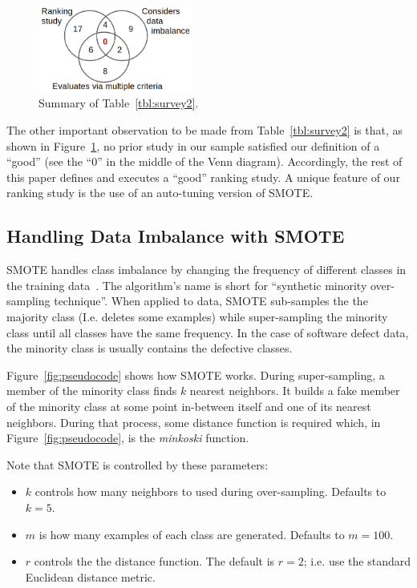 \documentclass[10pt,conference]{IEEEtran}
\newcommand{\bi}{\begin{itemize}[leftmargin=0.4cm]}
\newcommand{\ei}{\end{itemize}}
\theoremstyle{break}
\theoremstyle{break}
\begin{document}
\begin{figure}[!t]
\begin{center}
\includegraphics[width=2in]{venn.png}
\end{center}
\caption{Summary of Table~\ref{tbl:survey2}.}\label{fig:s2}
\end{figure}
The other important observation to be made from  Table~\ref{tbl:survey2} is that, as shown in Figure~\ref{fig:s2}, no prior study in our sample satisfied  our definition of a ``good'' (see the ``0'' in the middle of the Venn diagram).
Accordingly, the rest of this
paper defines and executes a ``good'' ranking  study. A unique feature of our
ranking study is the use of an auto-tuning version of SMOTE.
 
 
 
\subsection{Handling Data Imbalance with SMOTE}

SMOTE handles class imbalance by changing the frequency of different classes in the training
data~\cite{chawla2002smote}. 
The algorithm's name is short for ``synthetic minority over-sampling technique''.
When applied to data, SMOTE sub-samples the 
the majority class (I.e. deletes some examples)
while super-sampling the minority class
until
all classes have the same frequency.  In the case of software defect data,
the minority class is usually    contains the  defective classes.



Figure~\ref{fig:pseudocode} shows how SMOTE works. During super-sampling,
a member of the minority class finds $k$ nearest neighbors. It builds a fake member
of the minority class at some point in-between itself and one of its nearest
neighbors.  During that process, some distance function is required which, in Figure~\ref{fig:pseudocode}, is the {\em minkoski} function. 

Note that SMOTE is controlled by these  parameters:
\bi
\item $k$ controls how many neighbors to used during over-sampling. Defaults to $k=5$.
\item $m$ is how many examples of each class are generated. Defaults to $m=100$.
\item $r$ controls the the distance function. The default is $r=2$;
i.e. use the  
standard Euclidean distance metric.
\ei
 
\end{document}

